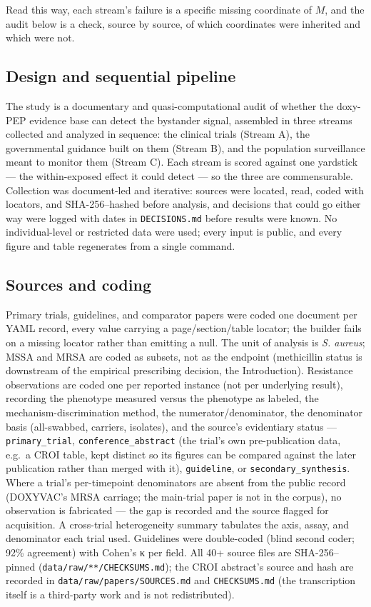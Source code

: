\documentclass[10pt,letterpaper]{article}
\begin{document}
Read this way, each stream's failure is a specific missing coordinate of
\(M\), and the audit below is a check, source by source, of which
coordinates were inherited and which were not.

\subsection*{Design and sequential pipeline}

The study is a documentary and quasi-computational audit of whether the
doxy-PEP evidence base can detect the bystander signal, assembled in
three streams collected and analyzed in sequence: the clinical trials
(Stream A), the governmental guidance built on them (Stream B), and the
population surveillance meant to monitor them (Stream C). Each stream is
scored against one yardstick --- the within-exposed effect it could
detect --- so the three are commensurable. Collection was document-led
and iterative: sources were located, read, coded with locators, and
SHA-256--hashed before analysis, and decisions that could go either way
were logged with dates in \texttt{DECISIONS.md} before results were
known. No individual-level or restricted data were used; every input is
public, and every figure and table regenerates from a single command.

\subsection*{Sources and coding}

Primary trials, guidelines, and comparator papers were coded one
document per YAML record, every value carrying a page/section/table
locator; the builder fails on a missing locator rather than emitting a
null. The unit of analysis is \emph{S. aureus}; MSSA and MRSA are coded
as subsets, not as the endpoint (methicillin status is downstream of the
empirical prescribing decision, the Introduction). Resistance
observations are coded one per reported instance (not per
underlying result), recording the phenotype measured versus the
phenotype as labeled, the mechanism-discrimination method, the
numerator/denominator, the denominator basis (all-swabbed, carriers,
isolates), and the source's evidentiary status ---
\texttt{primary\_trial}, \texttt{conference\_abstract} (the trial's own
pre-publication data, e.g.~a CROI table, kept distinct so its figures
can be compared against the later publication rather than merged with
it), \texttt{guideline}, or \texttt{secondary\_synthesis}. Where a
trial's per-timepoint denominators are absent from the public record
(DOXYVAC's MRSA carriage; the main-trial paper is not in the corpus), no
observation is fabricated --- the gap is recorded and the source flagged
for acquisition. A cross-trial heterogeneity summary tabulates the axis,
assay, and denominator each trial used. Guidelines were double-coded (blind
second coder; 92\% agreement) with Cohen's κ per field. All 40+ source
files are SHA-256--pinned (\texttt{data/raw/**/CHECKSUMS.md}); the CROI
abstract's source and hash are recorded in
\texttt{data/raw/papers/SOURCES.md} and \texttt{CHECKSUMS.md} (the
transcription itself is a third-party work and is not redistributed).
\end{document}
